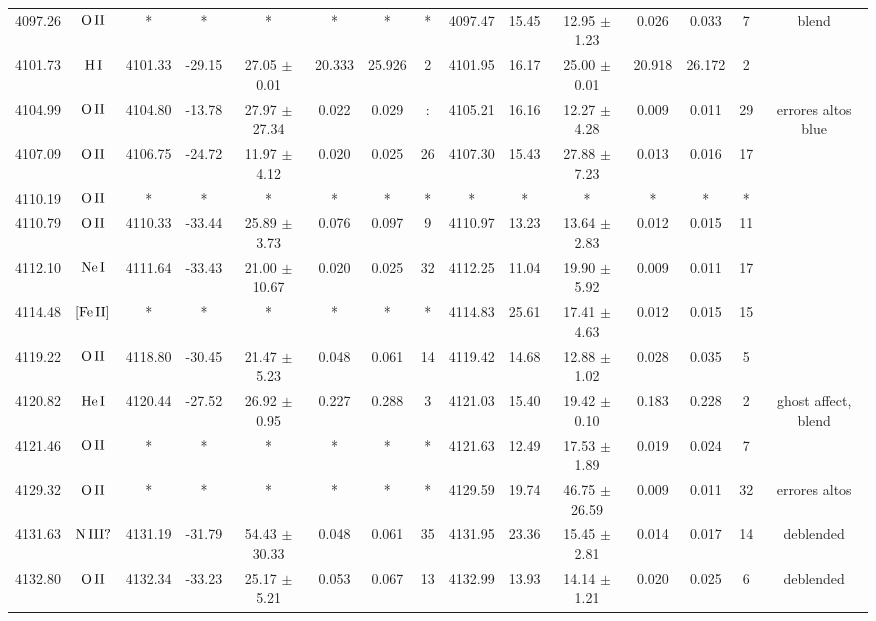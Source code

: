 \documentclass{article}
\begin{document}
\begin{table*}
\begin{adjustbox}{width=\textwidth}
\begin{tabular}{ccccccccccccccc}
4097.26 & $\mbox{O}\thinspace \mbox{II}$ & * & * & * & * & * & * & 4097.47 & 15.45 & 12.95 $\pm$ 1.23 & 0.026 & 0.033 & 7 &  blend \\
4101.73 & $\mbox{H}\thinspace \mbox{I}$ & 4101.33 & -29.15 & 27.05 $\pm$ 0.01 & 20.333 & 25.926 & 2 & 4101.95 & 16.17 & 25.00 $\pm$ 0.01 & 20.918 & 26.172 & 2 &  \\
4104.99 & $\mbox{O}\thinspace \mbox{II}$ & 4104.80 & -13.78 & 27.97 $\pm$ 27.34 & 0.022 & 0.029 & : & 4105.21 & 16.16 & 12.27 $\pm$ 4.28 & 0.009 & 0.011 & 29 &  errores altos blue \\
4107.09 & $\mbox{O}\thinspace \mbox{II}$ & 4106.75 & -24.72 & 11.97 $\pm$ 4.12 & 0.020 & 0.025 & 26 & 4107.30 & 15.43 & 27.88 $\pm$ 7.23 & 0.013 & 0.016 & 17 &  \\
4110.19 & $\mbox{O}\thinspace \mbox{II}$ & * & * & * & * & * & * & * & * & * & * & * & * &  \\
4110.79 & $\mbox{O}\thinspace \mbox{II}$ & 4110.33 & -33.44 & 25.89 $\pm$ 3.73 & 0.076 & 0.097 & 9 & 4110.97 & 13.23 & 13.64 $\pm$ 2.83 & 0.012 & 0.015 & 11 &  \\
4112.10 & $\mbox{Ne}\thinspace \mbox{I}$ & 4111.64 & -33.43 & 21.00 $\pm$ 10.67 & 0.020 & 0.025 & 32 & 4112.25 & 11.04 & 19.90 $\pm$ 5.92 & 0.009 & 0.011 & 17 &  \\
4114.48 & $\mbox{[Fe}\thinspace \mbox{II]}$ & * & * & * & * & * & * & 4114.83 & 25.61 & 17.41 $\pm$ 4.63 & 0.012 & 0.015 & 15 &  \\
4119.22 & $\mbox{O}\thinspace \mbox{II}$ & 4118.80 & -30.45 & 21.47 $\pm$ 5.23 & 0.048 & 0.061 & 14 & 4119.42 & 14.68 & 12.88 $\pm$ 1.02 & 0.028 & 0.035 & 5 &  \\
4120.82 & $\mbox{He}\thinspace \mbox{I}$ & 4120.44 & -27.52 & 26.92 $\pm$ 0.95 & 0.227 & 0.288 & 3 & 4121.03 & 15.40 & 19.42 $\pm$ 0.10 & 0.183 & 0.228 & 2 &  ghost affect, blend \\
4121.46 & $\mbox{O}\thinspace \mbox{II}$ & * & * & * & * & * & * & 4121.63 & 12.49 & 17.53 $\pm$ 1.89 & 0.019 & 0.024 & 7 &  \\
4129.32 & $\mbox{O}\thinspace \mbox{II}$ & * & * & * & * & * & * & 4129.59 & 19.74 & 46.75 $\pm$ 26.59 & 0.009 & 0.011 & 32 &  errores altos \\
4131.63 & $\mbox{N}\thinspace \mbox{III?}$ & 4131.19 & -31.79 & 54.43 $\pm$ 30.33 & 0.048 & 0.061 & 35 & 4131.95 & 23.36 & 15.45 $\pm$ 2.81 & 0.014 & 0.017 & 14 &  deblended \\
4132.80 & $\mbox{O}\thinspace \mbox{II}$ & 4132.34 & -33.23 & 25.17 $\pm$ 5.21 & 0.053 & 0.067 & 13 & 4132.99 & 13.93 & 14.14 $\pm$ 1.21 & 0.020 & 0.025 & 6 &  deblended \\

\end{tabular}
\end{adjustbox}
\end{table*}
\end{document}
